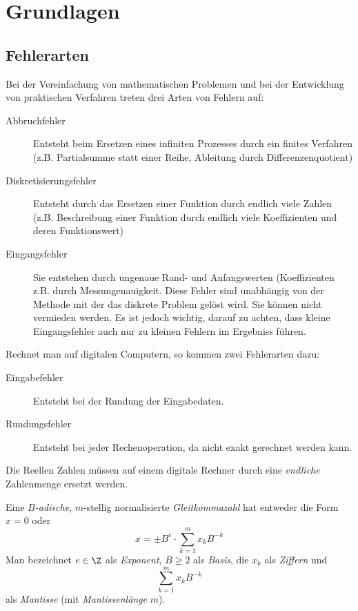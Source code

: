 \documentclass[a4paper]{scrartcl}
\numberwithin{equation}{section}
\begin{document}
\section{Grundlagen}

\subsection{Fehlerarten}

Bei der Vereinfachung von mathematischen Problemen und bei der Entwicklung von 
praktischen Verfahren treten drei Arten von Fehlern auf:
\begin{description}
\item[Abbruchfehler] Entsteht beim Ersetzen eines infiniten Prozesses durch ein finites Verfahren
(z.B. Partialsumme statt einer Reihe, Ableitung durch Differenzenquotient)
\item[Diskretisierungsfehler] Entsteht durch das Ersetzen einer Funktion durch endlich viele Zahlen
	(z.B. Beschreibung einer Funktion durch endlich viele Koeffizienten und deren Funktionswert)
\item[Eingangsfehler] Sie entstehen durch ungenaue Rand- und Anfangswerten (Koeffizienten z.B. durch Messungenauigkeit.
Diese Fehler sind unabhängig von der Methode mit der das diskrete Problem gelöst wird.
Sie können nicht vermieden werden.
Es ist jedoch wichtig, darauf zu achten, dass kleine Eingangsfehler auch nur zu kleinen Fehlern im Ergebniss führen.
\end{description}
Rechnet man auf digitalen Computern, so kommen zwei Fehlerarten dazu:
\begin{description}
\item[Eingabefehler] Entsteht bei der Rundung der Eingabedaten.
\item[Rundungsfehler] Entsteht bei jeder Rechenoperation, da nicht exakt gerechnet werden kann.
\end{description}

Die Reellen Zahlen müssen auf einem digitale Rechner durch eine \emph{endliche} Zahlenmenge ersetzt werden.

\begin{df}
\label{df: 2.1}
	Eine \emph{$B$-adische}, $m$-stellig normalisierte \emph{Gleitkommazahl} hat entweder die Form $x=0$ oder 
\[
	x=\pm B^e \cdot \sum_{k=1}^m x_kB^{-k}
\]
Man bezeichnet $e\in \Z$ als \emph{Exponent}, $B\ge 2$ als \emph{Basis}, die $x_k$ als \emph{Ziffern} und 
\[
	\sum_{k=1}^m x_kB^{-k}
\]
als \emph{Mantisse} (mit \emph{Mantissenlänge} $m$).

\end{df}
\end{document}
